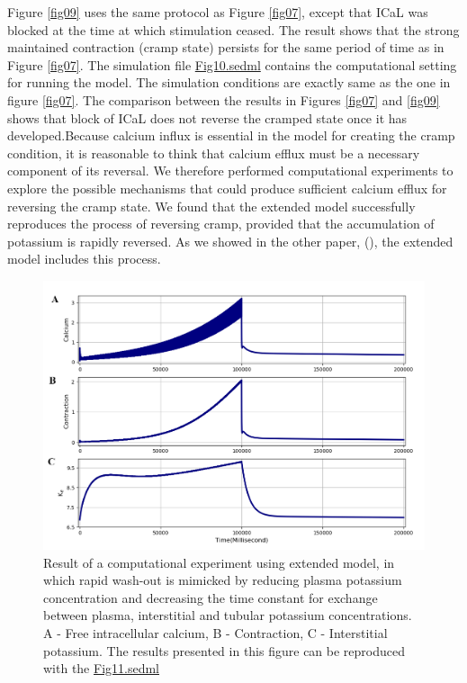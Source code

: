 \documentclass[fleqn,10pt]{physiome}
\begin{document}
Figure \ref{fig09} uses the same protocol as Figure \ref{fig07}, except that ICaL was blocked at the time at which stimulation ceased. The result shows that the strong maintained contraction (cramp state) persists for the same period of time as in Figure \ref{fig07}. The simulation file \href{http://models.cellml.org/workspace/5f4/file/4071d5b4ec40c5e2b845a7a75e942df1966d2ba2/Fig10.sedml}{Fig10.sedml} contains the computational setting for running the model. The simulation conditions are exactly same as the one in figure \ref{fig07}.\newline 
The comparison between the results in Figures \ref{fig07} and \ref{fig09} shows that block of ICaL does not reverse the cramped state once it has developed.Because calcium influx is essential in the model for creating the cramp condition, it is reasonable to think that calcium efflux must be a necessary component of its reversal. We therefore performed computational experiments to explore the possible mechanisms that could produce sufficient calcium efflux for reversing the cramp state. We found that the extended model successfully reproduces the process of reversing cramp, provided that the accumulation of potassium is rapidly reversed. As we showed in the other paper, (\citep{Noble2019Incorporation}), the extended model includes this process.\newpage
\begin{figure}[h!]
\centering
\includegraphics[width=0.9\linewidth]{figure10}
\caption{Result of a computational experiment using extended model, in which rapid wash-out is mimicked by reducing plasma potassium concentration and decreasing the time constant for exchange between plasma, interstitial and tubular potassium concentrations. A - Free intracellular calcium, B - Contraction, C - Interstitial potassium. The results presented in this figure can be reproduced with the \href{https://models.physiomeproject.org/workspace/5f4/file/26289d9227fbf4f66ca8106d8bf80ff9a51a5ac6/Fig11.sedml}{Fig11.sedml}}
\label{fig10}
\end{figure}
\end{document}
